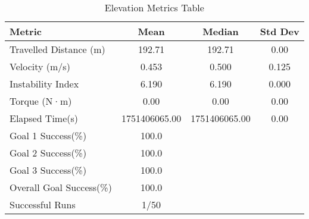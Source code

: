 \documentclass{article}
\begin{document}
\begin{table}[htbp]
\centering
\caption{Elevation Metrics Table}
\label{tab:simulation-metrics}
\begin{tabular}{@{} l S[table-format=3.2] S[table-format=3.2] S[table-format=1.3] @{}}
\toprule
\textbf{Metric} & \textbf{Mean} & \textbf{Median} & \textbf{Std Dev} \\
\midrule
Travelled Distance (m) & 192.71 & 192.71 & 0.00 \\
Velocity (m/s) & 0.453 & 0.500 & 0.125 \\
Instability Index & 6.190 & 6.190 & 0.000 \\
Torque (N·m) & 0.00 & 0.00 & 0.00 \\
Elapsed Time(s) & 1751406065.00 & 1751406065.00 & 0.00 \\
Goal 1 Success(\%) & {100.0} \\
Goal 2 Success(\%) & {100.0} \\
Goal 3 Success(\%) & {100.0} \\
Overall Goal Success(\%) & {100.0} \\
Successful Runs & {1/50} \\

\bottomrule
\end{tabular}
\end{table}
\end{document}
